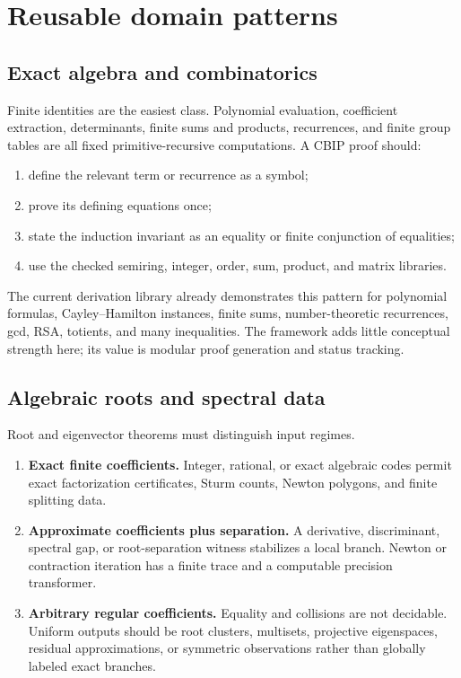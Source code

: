 \section{Reusable domain patterns}

\subsection{Exact algebra and combinatorics}

Finite identities are the easiest class.  Polynomial evaluation, coefficient extraction, determinants, finite sums and products, recurrences, and finite group tables are all fixed primitive-recursive computations.  A CBIP proof should:
\begin{enumerate}
\item define the relevant term or recurrence as a  symbol;
\item prove its defining equations once;
\item state the induction invariant as an equality or finite conjunction of equalities;
\item use the checked semiring, integer, order, sum, product, and matrix libraries.
\end{enumerate}

The current derivation library already demonstrates this pattern for polynomial formulas, Cayley--Hamilton instances, finite sums, number-theoretic recurrences, gcd, RSA, totients, and many inequalities.  The framework adds little conceptual strength here; its value is modular proof generation and status tracking.

\subsection{Algebraic roots and spectral data}

Root and eigenvector theorems must distinguish input regimes.

\begin{enumerate}
\item \textbf{Exact finite coefficients.}  Integer, rational, or exact algebraic codes permit exact factorization certificates, Sturm counts, Newton polygons, and finite splitting data.
\item \textbf{Approximate coefficients plus separation.}  A derivative, discriminant, spectral gap, or root-separation witness stabilizes a local branch.  Newton or contraction iteration has a finite trace and a computable precision transformer.
\item \textbf{Arbitrary regular coefficients.}  Equality and collisions are not decidable.  Uniform outputs should be root clusters, multisets, projective eigenspaces, residual approximations, or symmetric observations rather than globally labeled exact branches.
\end{enumerate}

